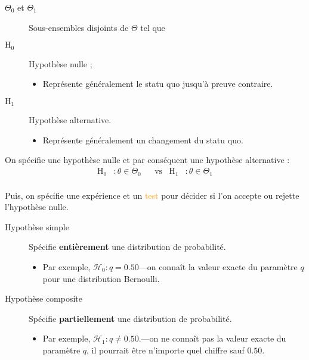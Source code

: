 \documentclass[10pt, french]{article}
\begin{document}
\begin{multicols*}{2}
\begin{distributions}[Notation]
\begin{description}
	\item[$\Theta_{0}$ et $\Theta_{1}$]	Sous-ensembles disjoints de $\Theta$ tel que 
	\item[$\textrm{H}_{0}$]	Hypothèse nulle ;
		\begin{itemize}
		\item	Représente généralement le statu quo jusqu'à preuve contraire.
		\end{itemize}
	\item[$\textrm{H}_{1}$]	Hypothèse alternative.
		\begin{itemize}
		\item	Représente généralement un changement du statu quo.
		\end{itemize}
\end{description}
\end{distributions}

\begin{definitionNOHFILL}
On spécifie une \textcolor{burntorange}{hypothèse} nulle et par conséquent une hypothèse alternative :
\begin{align*}
	\textrm{H}_{0}
	&:	\theta \in \Theta_{0}	&
	&\text{vs}	&
	\textrm{H}_{1}
	&:	\theta \in \Theta_{1}	\\
\end{align*}

Puis, on spécifie une \textcolor{orange-red}{expérience} et un \textcolor{orange}{test} pour décider si l'on accepte ou rejette l'hypothèse nulle.
\end{definitionNOHFILL}

\begin{distributions}[Terminologie]
\begin{description}
\item[Hypothèse simple]	Spécifie \textbf{entièrement} une distribution de probabilité.
	\begin{itemize}
	\item	Par exemple, $\mathcal{H}_{0}	:	q = 0.50$---on connaît la valeur exacte du paramètre $q$ pour une distribution Bernoulli.
	\end{itemize}
\item[Hypothèse composite]	Spécifie \textbf{partiellement} une distribution de probabilité.
	\begin{itemize}
	\item	Par exemple, $\mathcal{H}_{1}	:	q \neq 0.50$.---on ne connaît pas la valeur exacte du paramètre $q$, il pourrait être n'importe quel chiffre sauf $0.50$.
	\end{itemize}
\end{description}
\end{distributions}


\end{multicols*}
\end{document}
